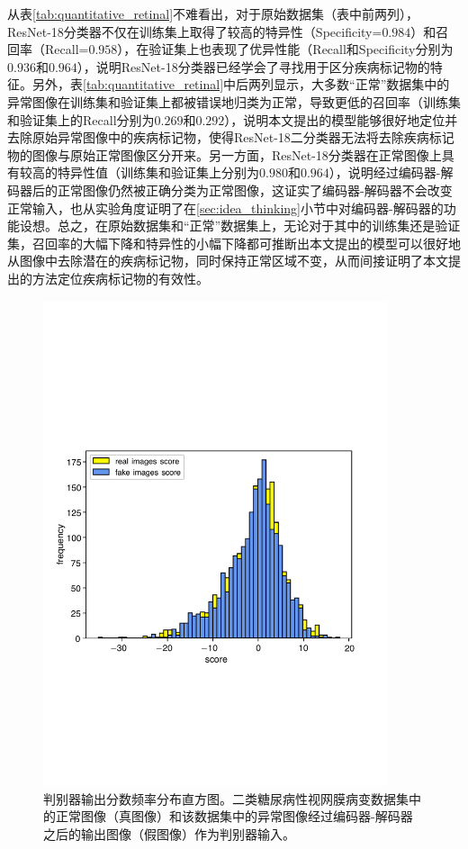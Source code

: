 从表\ref{tab:quantitative_retinal}不难看出，对于原始数据集（表中前两列），ResNet-18分类器不仅在训练集上取得了较高的特异性（Specificity=$0.984$）和召回率（Recall=$0.958$），在验证集上也表现了优异性能（Recall和Specificity分别为$0.936$和$0.964$），说明ResNet-18分类器已经学会了寻找用于区分疾病标记物的特征。另外，表\ref{tab:quantitative_retinal}中后两列显示，大多数“正常”数据集中的异常图像在训练集和验证集上都被错误地归类为正常，导致更低的召回率（训练集和验证集上的Recall分别为$0.269$和$0.292$），说明本文提出的模型能够很好地定位并去除原始异常图像中的疾病标记物，使得ResNet-18二分类器无法将去除疾病标记物的图像与原始正常图像区分开来。另一方面，ResNet-18分类器在正常图像上具有较高的特异性值（训练集和验证集上分别为$0.980$和$0.964$），说明经过编码器-解码器后的正常图像仍然被正确分类为正常图像，这证实了编码器-解码器不会改变正常输入，也从实验角度证明了在\ref{sec:idea_thinking}小节中对编码器-解码器的功能设想。总之，在原始数据集和“正常”数据集上，无论对于其中的训练集还是验证集，召回率的大幅下降和特异性的小幅下降都可推断出本文提出的模型可以很好地从图像中去除潜在的疾病标记物，同时保持正常区域不变，从而间接证明了本文提出的方法定位疾病标记物的有效性。
\begin{figure}[h]
	\centering
	\includegraphics[width=0.9\textwidth]{figure/score_distribution}
	\caption[判别器输出分数频率分布直方图]{判别器输出分数频率分布直方图。二类糖尿病性视网膜病变数据集中的正常图像（真图像）和该数据集中的异常图像经过编码器-解码器之后的输出图像（假图像）作为判别器输入。}
	\label{fig:hist_freq}
\end{figure}

